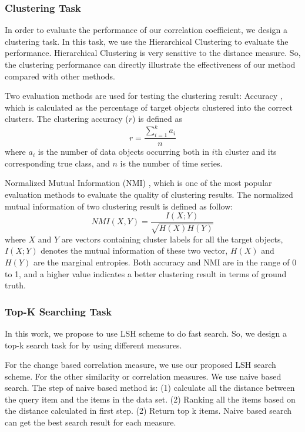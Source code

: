 \subsubsection{Clustering Task}

In order to evaluate the performance of our correlation coefficient, we design a clustering task. 
In this task, we use the Hierarchical Clustering \cite{han2011data} to evaluate the performance. Hierarchical Clustering is very sensitive to the distance measure. So, the clustering performance can directly illustrate the effectiveness of our method compared with other methods.

Two evaluation methods are used for testing the clustering result: Accuracy \cite{han2011data}, which is calculated as the percentage of target objects clustered into the correct clusters. The clustering accuracy ($r$) is defined as
\[
r = \frac{\sum\nolimits_{i=1}^{k}a_i}{n}
\]
where $a_i$ is the number of data objects occurring both in $i$th cluster and its corresponding true class, and $n$ is the number of time series.

Normalized Mutual Information (NMI) \cite{han2011data}, which is one of the most popular evaluation methods to evaluate the quality of clustering results. The normalized mutual information of two clustering result is defined as follow:
\[
NMI(X,Y) = \frac{I(X;Y)}{\sqrt{H(X)H(Y)}}
\]
where $X$ and $Y$ are vectors containing cluster labels for all the target objects, $I(X;Y)$ denotes the mutual information\cite{han2011data} of these two vector, $H(X)$ and $H(Y)$ are the marginal entropies\cite{han2011data}. 
Both accuracy and NMI are in the range of 0 to 1, and a higher value indicates a better clustering result in terms of ground truth.

\subsubsection{Top-K Searching Task}

In this work, we propose to use LSH scheme to do fast search. So, we design a top-k search task for by using different measures.

For the change based correlation measure, we use our proposed LSH search scheme. For the other similarity or correlation measures. We use naive based search. The step of naive based method is: (1) calculate all the distance between the query item and the items in the data set. (2) Ranking all the items based on the distance calculated in first step. (2) Return top k items. Naive based search can get the best search result for each measure.


